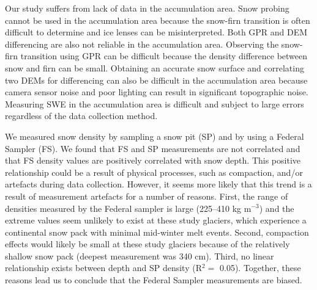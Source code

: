 \documentclass[twocolumn,letterpaper]{igs}
\begin{document}
Our study suffers from lack of data in the accumulation area. Snow probing cannot be used in the accumulation area because the snow-firn transition is often difficult to determine and ice lenses can be misinterpreted. Both GPR and DEM differencing are also not reliable in the accumulation area. Observing the snow-firn transition using GPR can be difficult because the density difference between snow and firn can be small. Obtaining an accurate snow surface and correlating two DEMs for differencing can also be difficult in the accumulation area because camera sensor noise and poor lighting can result in significant topographic noise. Measuring SWE in the accumulation area is difficult and subject to large errors regardless of the data collection method.

We measured snow density by sampling a snow pit (SP) and by using a Federal Sampler (FS). We found that FS and SP measurements are not correlated and that FS density values are positively correlated with snow depth. This positive relationship could be a result of physical processes, such as compaction, and/or artefacts during data collection. However, it seems more likely that this trend is a result of measurement artefacts for a number of reasons. First, the range of densities measured by the Federal sampler is large (225--410 kg m$^{-3}$) and the extreme values seem unlikely to exist at these study glaciers, which experience a continental snow pack with minimal mid-winter melt events. Second, compaction effects would likely be small at these study glaciers because of the relatively shallow snow pack (deepest measurement was 340 cm). Third, no linear relationship exists between depth and SP density (R$^2=$ 0.05). Together, these reasons lead us to conclude that the Federal Sampler measurements are biased. 
\end{document}

